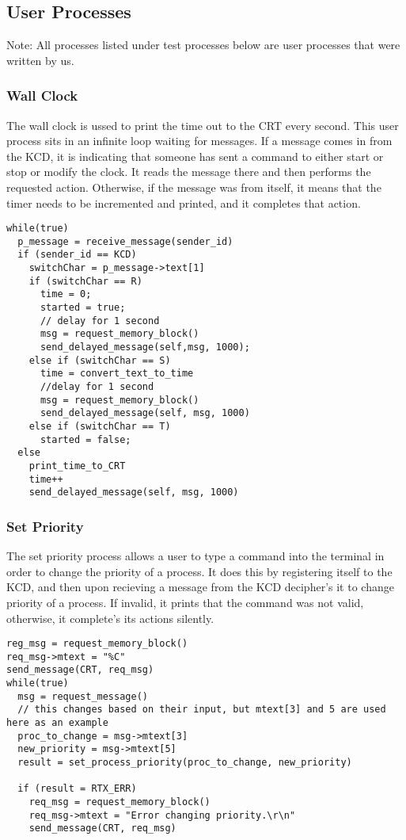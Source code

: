 \documentclass[12pt]{article}
\begin{document}
\subsection{User Processes}\label{userp}

Note: All processes listed under test processes below are user processes that were written by us.
\subsubsection{Wall Clock}\label{wallclockp}
The wall clock is ussed to print the time out to the CRT every second. This user process sits in an infinite loop waiting for messages. If a message comes in from the KCD, it is indicating that someone has sent a command to either start or stop or modify the clock. It reads the message there and then performs the requested action. Otherwise, if the message was from itself, it means that the timer needs to be incremented and printed, and it completes that action.

\begin{lstlisting}[breaklines=true]
while(true)
  p_message = receive_message(sender_id)
  if (sender_id == KCD)
    switchChar = p_message->text[1]
    if (switchChar == R)
      time = 0;
      started = true;
      // delay for 1 second
      msg = request_memory_block()
      send_delayed_message(self,msg, 1000);
    else if (switchChar == S)
      time = convert_text_to_time
      //delay for 1 second
      msg = request_memory_block()
      send_delayed_message(self, msg, 1000)
    else if (switchChar == T)
      started = false;
  else
    print_time_to_CRT
    time++
    send_delayed_message(self, msg, 1000)

\end{lstlisting}

\subsubsection{Set Priority} \label{setpriorityp}
The set priority process allows a user to type a command into the terminal in order to change the priority of a process. It does this by registering itself to the KCD, and then upon recieving a message from the KCD decipher's it to change priority of a process. If invalid, it prints that the command was not valid, otherwise, it complete's its actions silently.

\begin{lstlisting}[breaklines=true]
reg_msg = request_memory_block()
req_msg->mtext = "%C"
send_message(CRT, req_msg)
while(true)
  msg = request_message()
  // this changes based on their input, but mtext[3] and 5 are used here as an example
  proc_to_change = msg->mtext[3]
  new_priority = msg->mtext[5]
  result = set_process_priority(proc_to_change, new_priority)

  if (result = RTX_ERR)
    req_msg = request_memory_block()
    req_msg->mtext = "Error changing priority.\r\n"
    send_message(CRT, req_msg)
\end{lstlisting}
\end{document}
